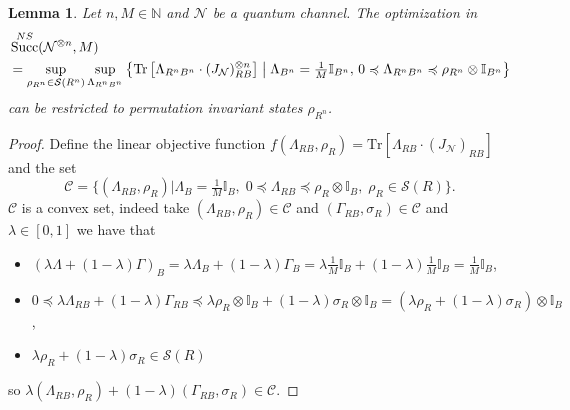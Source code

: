 \documentclass[a4paper,onecolumn,11pt,accepted=2025-10-01]{quantumarticle}
\newtheorem{lem}[theorem]{Lemma}
\DeclareMathOperator{\suc}{Succ}
\newcommand*{\cC}{\mathcal{C}}
\newcommand*{\dI}{\mathbb{I}}
\newcommand*{\cN}{\mathcal{N}}
\newcommand*{\cS}{\mathcal{S}}
\newcommand*{\tr}[1]{\mathrm{Tr}\left[#1\right]}
\newcommand*{\mle}{\preccurlyeq}
\begin{document}
\begin{lem}\label{lem:red-perm-invt-states}
Let $n, M\in \mathbb{N}$ and $\cN$ be a quantum channel.
The optimization in 
  \begin{align}
         &  \suc^{\rm{NS}}(\cN^{\otimes n},M)
         \\&= \sup_{\rho_{R^n} \in \cS(R^n)} \sup_{\Lambda_{R^nB^n}} \left\{\tr{\Lambda_{R^nB^n} \cdot (J_{\cN})_{RB}^{\otimes n}} \;\middle|\; \Lambda_{B^n} = \tfrac{1}{M}\mathbb{I}_{B^n},\, 0\mle  \Lambda_{R^nB^n} \mle \rho_{R^n} \otimes  \mathbb{I}_{B^n}\right\}
\end{align}
can be restricted to permutation invariant states $\rho_{R^n}$. 
\end{lem}
\begin{proof}
Define the linear objective function $f(\Lambda_{RB}, \rho_{R})=\tr{\Lambda_{RB} \cdot (J_{\cN})_{RB}} $ and the set \[\cC=\{(\Lambda_{RB}, \rho_{R})|\Lambda_B = \tfrac{1}{M}\mathbb{I}_B, \;  0\mle  \Lambda_{RB} \mle \rho_R \otimes  \mathbb{I}_B, \; \rho_R \in \cS(R)\}.\] 
$\cC$ is a convex set, indeed take $(\Lambda_{RB}, \rho_{R})\in \cC$ and $(\Gamma_{RB}, \sigma_{R})\in \cC$ and $\lambda\in [0,1]$ we have that 
\begin{itemize}
    \item $(\lambda \Lambda +(1-\lambda)\Gamma)_B = \lambda \Lambda_{B} +(1-\lambda)\Gamma_{B} = \lambda \frac{1}{M}\dI_{B} +(1-\lambda)\frac{1}{M}\dI_{B}=\frac{1}{M}\dI_{B}$,
    \item $0\mle \lambda \Lambda_{RB} +(1-\lambda)\Gamma_{RB} \mle  \lambda \rho_{R}\otimes \dI_B +(1-\lambda)\sigma_{R}\otimes \dI_B = (\lambda \rho_{R} +(1-\lambda)\sigma_{R})\otimes \dI_B $,
    \item $\lambda \rho_{R} +(1-\lambda)\sigma_{R}\in \cS(R)$
\end{itemize}
so $\lambda(\Lambda_{RB}, \rho_{R})+(1-\lambda)(\Gamma_{RB}, \sigma_{R})\in \cC$. 


\end{proof}
\end{document}

